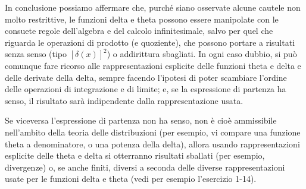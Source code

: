 \documentclass[11pt, a4paper]{book}
\numberwithin{equation}{section}
\begin{document}
In conclusione possiamo affermare che, purché siano osservate alcune cautele non molto restrittive, le funzioni delta e theta possono essere manipolate con le consuete regole dell'algebra e del calcolo infinitesimale, salvo per quel che riguarda le operazioni di prodotto (e quoziente), che possono portare a risultati senza senso (tipo $[\delta(x)]^2$) o addirittura sbagliati. In ogni caso dubbio, si può comunque fare ricorso alle rappresentazioni esplicite delle funzioni theta e delta e delle derivate della delta, sempre facendo l'ipotesi di poter scambiare l'ordine delle operazioni di integrazione e di limite; e, se la espressione di partenza ha senso, il risultato sarà indipendente dalla rappresentazione usata.

Se viceversa l'espressione di partenza non ha senso, non è cioè ammissibile nell'ambito della teoria delle distribuzioni (per esempio, vi compare una funzione theta a denominatore, o una potenza della delta), allora usando rappresentazioni esplicite delle theta e delta si otterranno risultati sballati (per esempio, divergenze) o, se anche finiti, diversi a seconda delle diverse rappresentazioni usate per le funzioni delta e theta (vedi per esempio l'esercizio 1-14).
\end{document}
